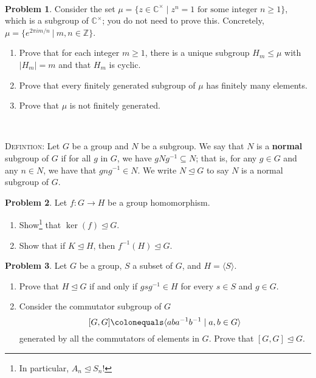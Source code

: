 \documentclass[11pt]{article}
\newcommand{\C}{\mathbb{C}}
\newcommand{\Z}{\mathbb{Z}}
\newcommand{\norm}{\trianglelefteq}
\theoremstyle{definition}
\newtheorem{problem}{Problem}
\begin{document}
\


\begin{problem} Consider the set  $\mu=\{z\in \C^\times \mid  z^n = 1 \text{ for some integer }n \geq 1\}$, which is a subgroup of $\C^\times$; you do not need to prove this. Concretely, $\mu = \{ e^{2 \pi i m/n} \ | \ m,n\in \Z\}$.
\begin{enumerate}[(4.1)]

\item Prove that for each integer $m \geq 1$, there is a unique subgroup $H_m\leq \mu$ with  $|H_m|=m$ and that $H_m$ is cyclic.

\item Prove that every finitely generated subgroup of $\mu$ has finitely many elements.  

\item Prove that $\mu$ is not finitely generated.

\end{enumerate}


\end{problem}


\


\noindent \textsc{Defintion:} Let $G$ be a group and $N$ be a subgroup. We say that $N$ is a \textbf{normal} subgroup of $G$ if for all $g$ in $G$, we have $gNg^{-1} \subseteq N$; that is, for any $g\in G$ and any $n\in N$, we have that $gng^{-1}\in N$. We write $N \trianglelefteq G$ to say $N$ is a normal subgroup of $G$.

\begin{problem} Let $f: G\to H$ be a group homomorphism.
\begin{enumerate}[(5.1)]
\item Show\footnote{In particular, $A_n \trianglelefteq S_n$!} that $\ker(f) \trianglelefteq G$.
\item Show that if $K \trianglelefteq H$, then $f^{-1}(H) \trianglelefteq G$.
\end{enumerate}
\end{problem}

\begin{problem}
Let $G$ be a group, $S$ a subset of $G$, and $H=\langle S \rangle$.  

\begin{enumerate}[(6.1)]
\item Prove that $H \norm G$ if and only if $gsg^{-1}\in H$ for every $s\in S$ and $g\in G$.

\item Consider the commutator subgroup of $G$
$$[G,G] \colonequals \langle aba^{-1}b^{-1}\mid a,b\in G \rangle$$ 
generated by all the commutators of elements in $G$.
Prove that $[G,G] \norm G$.


\end{enumerate}
\end{problem}
\end{document}
